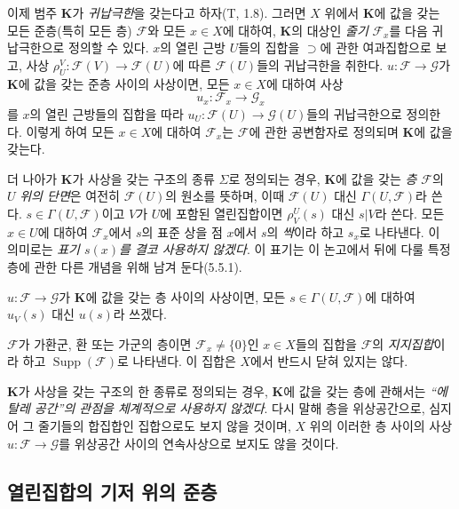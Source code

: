 \begin{env}[3.1.6]
\label{0.3.1.6-ko}
이제 범주 $\mathbf K$가 \emph{귀납극한}을 갖는다고 하자(T, 1.8). 그러면 $X$ 위에서 $\mathbf K$에 값을 갖는 모든 준층(특히 모든 층) $\mathcal F$와 모든 $x\in X$에 대하여, $\mathbf K$의 대상인 \emph{줄기} $\mathcal F_x$를 다음 귀납극한으로 정의할 수 있다. $x$의 열린 근방 $U$들의 집합을 $\supset$에 관한 여과집합으로 보고, 사상 $\rho_U^V:\mathcal F(V)\to\mathcal F(U)$에 따른 $\mathcal F(U)$들의 귀납극한을 취한다. $u:\mathcal F\to\mathcal G$가 $\mathbf K$에 값을 갖는 준층 사이의 사상이면, 모든 $x\in X$에 대하여 사상
\[
  u_x:\mathcal F_x\longrightarrow\mathcal G_x
\]
를 $x$의 열린 근방들의 집합을 따라 $u_U:\mathcal F(U)\to\mathcal G(U)$들의 귀납극한으로 정의한다. 이렇게 하여 모든 $x\in X$에 대하여 $\mathcal F_x$는 $\mathcal F$에 관한 공변함자로 정의되며 $\mathbf K$에 값을 갖는다.

더 나아가 $\mathbf K$가 사상을 갖는 구조의 종류 $\Sigma$로 정의되는 경우, $\mathbf K$에 값을 갖는 \emph{층 $\mathcal F$}의 $U$ \emph{위의 단면}은 여전히 $\mathcal F(U)$의 원소를 뜻하며, 이때 $\mathcal F(U)$ 대신 $\Gamma(U,\mathcal F)$라 쓴다. $s\in\Gamma(U,\mathcal F)$이고 $V$가 $U$에 포함된 열린집합이면 $\rho_V^U(s)$ 대신 $s|V$라 쓴다. 모든 $x\in U$에 대하여 $\mathcal F_x$에서 $s$의 표준 상을 점 $x$에서 $s$의 \emph{싹}이라 하고 $s_x$로 나타낸다. 이 의미로는 \emph{표기 $s(x)$를 결코 사용하지 않겠다}. 이 표기는 이 논고에서 뒤에 다룰 특정 층에 관한 다른 개념을 위해 남겨 둔다(5.5.1).

$u:\mathcal F\to\mathcal G$가 $\mathbf K$에 값을 갖는 층 사이의 사상이면, 모든 $s\in\Gamma(U,\mathcal F)$에 대하여 $u_V(s)$ 대신 $u(s)$라 쓰겠다.

$\mathcal F$가 가환군, 환 또는 가군의 층이면 $\mathcal F_x\neq\{0\}$인 $x\in X$들의 집합을 $\mathcal F$의 \emph{지지집합}이라 하고 $\operatorname{Supp}(\mathcal F)$로 나타낸다. 이 집합은 $X$에서 반드시 닫혀 있지는 않다.

$\mathbf K$가 사상을 갖는 구조의 한 종류로 정의되는 경우, $\mathbf K$에 값을 갖는 층에 관해서는 \emph{``에탈레 공간''의 관점을 체계적으로 사용하지 않겠다}. 다시 말해 층을 위상공간으로, 심지어 그 줄기들의 합집합인 집합으로도 보지 않을 것이며, $X$ 위의 이러한 층 사이의 사상 $u:\mathcal F\to\mathcal G$를 위상공간 사이의 연속사상으로 보지도 않을 것이다.
\end{env}

\subsection{열린집합의 기저 위의 준층}
\label{subsection:0.3.2-ko}

